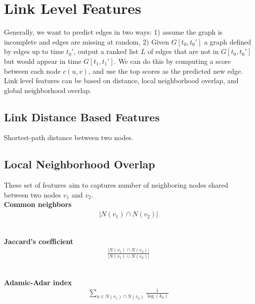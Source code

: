 \section{Link Level Features}
Generally, we want to predict edges in two ways: 1) assume the graph is incomplete and edges are missing at random, 2) Given $G[t_0, t_0']$ a graph defined by edges up to time $t_0'$, output a ranked list $L$ of edges that are not in $G[t_0, t_0']$ but would appear in time $G[t_1, t_1']$. We can do this by computing a score between each node $c(u,v)$, and use the top scores as the predicted new edge.\\
Link level features can be based on distance, local neighborhood overlap, and global neighborhood overlap.\\

\subsection{Link Distance Based Features} 
Shortest-path distance between two nodes. 


\subsection{Local Neighborhood Overlap}
These set of features aim to captures number of neighboring nodes shared between two nodes $v_1$ and $v_2$. \\
\textbf{Common neighbors}
    \begin{align*}
        |N(v_1) \cap N(v_2)|
    \end{align*}
\\ 
\par

\textbf{Jaccard's coefficient}
    \begin{align*}
        \frac{|N(v_1) \cap N(v_2)|}{|N(v_1) \cup N(v_2)|}
    \end{align*}
\\
\par

\textbf{Adamic-Adar index}
    \begin{align*}
        \sum_{u\in N(v_1) \cap N(v_2)} \frac{1}{\log(k_u)}
    \end{align*}



